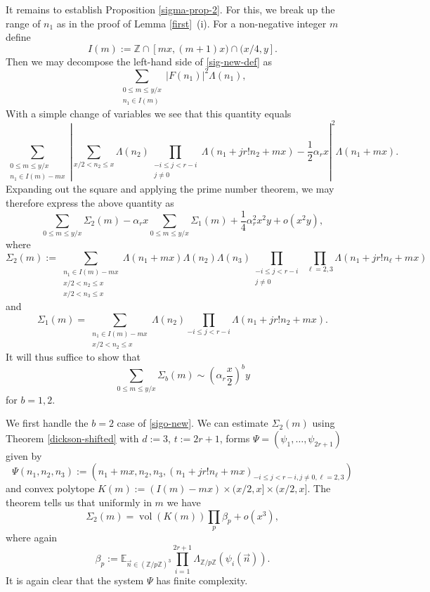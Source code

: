 \documentclass[11pt]{amsart}
\numberwithin{equation}{section}  %
\theoremstyle{remark}
\theoremstyle{plain}
\numberwithin{equation}{section}
\newcommand{\Z}{\mathbb{Z}}
\newcommand{\E}{\mathbb{E}}  %
\renewcommand{\le}{\leqslant}
\renewcommand{\leq}{\leqslant}
\renewcommand{\(}{\left(}
\renewcommand{\)}{\right)}
\newcommand{\asym}{\sim}   %
\newcommand{\vect}[1]{{\ensuremath{\vec{#1}}}}
\newcommand{\vol}{\operatorname{vol}}
\begin{document}
It remains to establish Proposition \ref{sigma-prop-2}.  For this, we break up the range of
$n_1$ as in the proof of Lemma \ref{first}~(i).
 For a non-negative integer $m$ define
\[ I(m) := \Z \cap [mx,(m+1)x) \cap (x/4, y].\]
Then we may decompose the left-hand side of \eqref{sig-new-def} as
\[ \sum_{\substack{0 \leq m \leq y/x\\ n_1 \in I(m)}}  |F(n_1)|^2\Lambda(n_1),\]
 With a simple change of variables we see that this quantity equals
\[ \sum_{\substack{0 \leq m \leq  y/x \\ n_1 \in I(m) - mx}} \left| \sum_{x/2<n_2\le x} \!\! \Lambda(n_2)\!\!\!\! \prod_{\substack{-i \leq j < r-i \\ j \neq 0}} \!\!\Lambda(n_1 +j r! n_2 + mx)  - \frac{1}{2}\alpha_r x\right |^2\Lambda(n_1 + mx). \]
Expanding out the square and applying the prime number theorem, we may therefore express the above quantity as
\[ \sum_{0\leq m \leq y/x} \Sigma_2(m) - \alpha_r x \sum_{0 \leq m
  \leq y/x} \Sigma_1(m) + \frac{1}{4}\alpha_r^2 x^2 y + o(x^2 y),\] 
where
\[ \Sigma_2(m) :=  \sum_{\substack{n_1 \in I(m) - mx \\ x/2<n_2 \le x
    \\ x/2 < n_3 \le x}}  \Lambda(n_1 + mx) \Lambda(n_2)\Lambda(n_3)
\!\!\!\prod_{\substack{-i \leq j < r - i \\ j \neq 0 }} \;
\prod_{\ell=2,3} \Lambda(n_1 + j r! n_{\ell} + mx) \]
and
\[ \Sigma_1(m) = \sum_{\substack{n_1 \in I(m) - mx \\ x/2<n_2\le x}}  \Lambda(n_2)\prod_{-i \leq j < r - i}\Lambda(n_1 +j r! n_2 + mx) .\]
It will thus suffice to show that
\begin{equation}\label{sigo-new}  \sum_{0 \leq m \leq y/x} \Sigma_b(m) \asym \left(\alpha_r \frac{x}{2}\right)^b y
\end{equation}
for $b=1,2$.

We first handle the $b=2$ case of \eqref{sigo-new}.  
We can estimate $\Sigma_2(m)$ using Theorem \ref{dickson-shifted} with $d := 3$, $t := 2r + 1$, forms $\Psi = (\psi_1,\dots, \psi_{2r+1})$ given by
\[ \Psi(n_1,n_2,n_3) := (n_1 + mx, n_2,n_3, (n_1 + jr! n_{\ell} + mx)_{-i\leq j < r-i, j \neq 0, \ell= 2,3} )\] and convex polytope $K(m) := (I(m) - mx) \times (x/2, x] \times (x/2,x]$. The theorem tells us that uniformly in $m$ we have
\begin{equation}\label{sig-1-prelim-new} \Sigma_2(m) = \vol(K(m)) \prod_p \beta_p + o(x^3),\end{equation} where again
\[ \beta_p := \E_{\vect{n} \in (\Z/p\Z)^3} \prod_{i = 1}^{2r +1} \Lambda_{\Z/p\Z}(\psi_i(\vect{n})).\]
It is again clear that the system $\Psi$ has finite complexity. 
\end{document}
